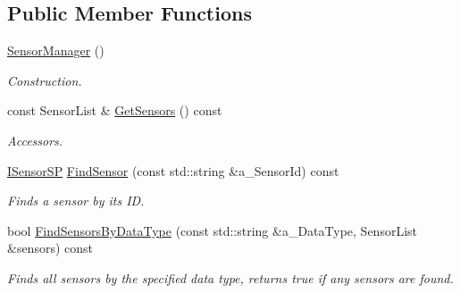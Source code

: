 \subsection*{Public Member Functions}
\begin{DoxyCompactItemize}
\item 
\mbox{\label{class_sensor_manager_ac2bea3e22536f101970bd20fc72fa5d1}} 
\hyperlink{class_sensor_manager_ac2bea3e22536f101970bd20fc72fa5d1}{Sensor\+Manager} ()
\begin{DoxyCompactList}\small\item\em Construction. \end{DoxyCompactList}\item 
\mbox{\label{class_sensor_manager_a762ec47d44fb9a4a6277182f68cf794f}} 
const Sensor\+List \& \hyperlink{class_sensor_manager_a762ec47d44fb9a4a6277182f68cf794f}{Get\+Sensors} () const
\begin{DoxyCompactList}\small\item\em Accessors. \end{DoxyCompactList}\item 
\mbox{\label{class_sensor_manager_a3b2b9c5fbd2a405af96cf6aca3e930f6}} 
\hyperlink{class_sensor_manager_a5cd8f6f5dfe0ccc8875ed536ae5df51e}{I\+Sensor\+SP} \hyperlink{class_sensor_manager_a3b2b9c5fbd2a405af96cf6aca3e930f6}{Find\+Sensor} (const std\+::string \&a\+\_\+\+Sensor\+Id) const
\begin{DoxyCompactList}\small\item\em Finds a sensor by it\textquotesingle{}s ID. \end{DoxyCompactList}\item 
\mbox{\label{class_sensor_manager_a70c5aeb3d8f44f00a011b20b835b0f18}} 
bool \hyperlink{class_sensor_manager_a70c5aeb3d8f44f00a011b20b835b0f18}{Find\+Sensors\+By\+Data\+Type} (const std\+::string \&a\+\_\+\+Data\+Type, Sensor\+List \&sensors) const
\begin{DoxyCompactList}\small\item\em Finds all sensors by the specified data type, returns true if any sensors are found. \end{DoxyCompactList}\item 
\mbox{\label{class_sensor_manager_a9a26305c41d9a296d8d4d5efc0afa159}} 

\end{DoxyCompactItemize}
